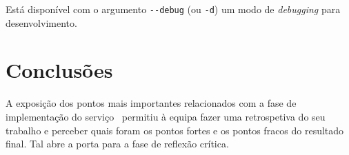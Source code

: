 Está disponível com o argumento \verb|--debug| (ou \verb|-d|) um modo de \textit{debugging} para desenvolvimento.


\section{Conclusões}
\label{sec::implementacao:concs}

A exposição dos pontos mais importantes relacionados com a fase de implementação do serviço \appname~permitiu à equipa fazer uma retrospetiva do seu trabalho e perceber quais foram os pontos fortes e os pontos fracos do resultado final. Tal abre a porta para a fase de reflexão crítica.

